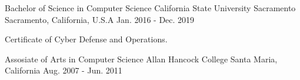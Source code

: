 

\begin{cventries}

  \cventry
    {Bachelor of Science in Computer Science} %
    {California State University Sacramento} %
    {Sacramento, California, U.S.A} %
	  {Jan. 2016 - Dec. 2019} %
    {
      \begin{cvitems} %
        \item {Certificate of Cyber Defense and Operations.}
      \end{cvitems}
    }

  \cventry
    {Assosiate of Arts in Computer Science} %
    {Allan Hancock College} %
    {Santa Maria, California} %
    {Aug. 2007 - Jun. 2011} %
    {
      \begin{cvitems} %
      \end{cvitems}
    }

\end{cventries}